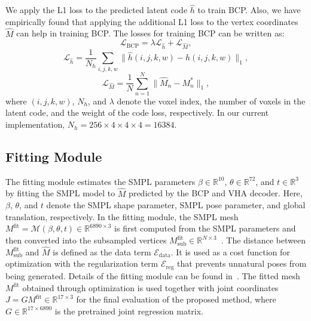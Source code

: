 \documentclass{article}
\begin{document}
We apply the L1 loss to the predicted latent code $\hat{h}$ to train BCP. Also, we have empirically found that applying the additional L1 loss to the vertex coordinates $\hat{M}$ can help in training BCP. The losses for training BCP can be written as:
\begin{equation}
\label{eq:bcp_loss}
    \mathcal{L}_{\text{BCP}}=\lambda\mathcal{L}_{\hat{h}}+\mathcal{L}_{\hat{M}},
\end{equation}
\begin{equation}
\label{eq:bcp_code_loss}
    \mathcal{L}_{\hat{h}}=\frac{1}{N_{h}}\sum_{i,j,k,w}\|\hat{h}(i,j,k,w)-h(i,j,k,w)\|_{1},
\end{equation}
\begin{equation}
\label{eq:bcp_vtx_loss}
    \mathcal{L}_{\hat{M}}=\frac{1}{N}\sum_{n=1}^{N}\|\hat{M}_{n}-M_{n}^{*}\|_{1},
\end{equation}
where $(i,j,k,w)$, $N_{h}$, and $\lambda$ denote the voxel index, the number of voxels in the latent code, and the weight of the code loss, respectively. In our current implementation, $N_h=256\times{}4\times{}4\times{}4=16384$.


\subsection{Fitting Module}
\label{ssec:fitting_module}

The fitting module estimates the SMPL parameters $\beta\in{}\mathbb{R}^{10}$, $\theta\in{}\mathbb{R}^{72}$, and $t\in{}\mathbb{R}^{3}$ by fitting the SMPL model to $\hat{M}$ predicted by the BCP and VHA decoder. Here, $\beta$, $\theta$, and $t$ denote the SMPL shape parameter, SMPL pose parameter, and global translation, respectively. In the fitting module, the SMPL mesh $M^{\text{fit}}=\mathcal{M}(\beta,\theta,t)\in{}\mathbb{R}^{6890\times{}3}$ is first computed from the SMPL parameters and then converted into the subsampled vertices $M^{\text{fit}}_{\text{sub}}\in{}\mathbb{R}^{N\times{}3}$~\cite{COMA_ECCV18, Chun_2023_WACV}. The distance between $M^{\text{fit}}_{\text{sub}}$ and $\hat{M}$ is defined as the data term $\mathcal{E}_{\text{data}}$. It is used as a cost function for optimization with the regularization term $\mathcal{E}_{\text{reg}}$ that prevents unnatural poses from being generated. Details of the fitting module can be found in~\cite{Chun_2023_WACV}. The fitted mesh $M^{\text{fit}}$ obtained through optimization is used together with joint coordinates $J=GM^{\text{fit}}\in{}\mathbb{R}^{17\times{}3}$ for the final evaluation of the proposed method, where $G\in{}\mathbb{R}^{17\times{}6890}$ is the pretrained joint regression matrix.
\end{document}
